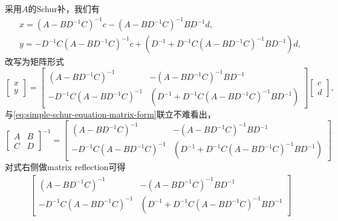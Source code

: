 \begin{subappendices}
采用$A$的Schur补，我们有
\begin{equation*}
  \begin{split}
    &x = \left( A - BD^{-1} C \right)^{-1} c - \left( A - BD^{-1} C \right)^{-1} BD^{-1} d, \\
    &y=-D^{-1} C \left( A - BD^{-1} C \right)^{-1} c + \left( D^{-1} + D^{-1} C \left( A - BD^{-1} C \right)^{-1} B D^{-1} \right) d,
  \end{split}
\end{equation*}
改写为矩阵形式
\begin{equation}
  \label{eq:simple-schur-A-rewrite-M}
  \begin{bmatrix}
    x \\ y
  \end{bmatrix} =
  \begin{bmatrix}
    \left( A - BD^{-1} C \right)^{-1} & - \left( A - BD^{-1} C \right)^{-1} BD^{-1} \\
    -D^{-1} C \left( A - BD^{-1} C \right)^{-1} & \left(
      D^{-1} + D^{-1} C \left( A - BD^{-1} C \right)^{-1} B D^{-1}
    \right)
  \end{bmatrix}
  \begin{bmatrix}
    c \\ d
  \end{bmatrix},
\end{equation}
与\eqref{eq:simple-schur-equation-matrix-form}联立不难看出，
\begin{equation}
  \label{eq:simple-schur-equation-matrix-inverse}
  \begin{bmatrix}
    A & B \\ C & D
  \end{bmatrix}^{-1}
  =
  \begin{bmatrix}
    \left( A - BD^{-1} C \right)^{-1} & - \left( A - BD^{-1} C \right)^{-1} BD^{-1} \\
    -D^{-1} C \left( A - BD^{-1} C \right)^{-1} & \left(
      D^{-1} + D^{-1} C \left( A - BD^{-1} C \right)^{-1} B D^{-1}
    \right)
  \end{bmatrix}
\end{equation}
对式右侧做matrix reflection可得
\begin{equation*}
  \begin{split}
    & \begin{bmatrix}
      \left( A - BD^{-1} C \right)^{-1} & - \left( A - BD^{-1} C \right)^{-1} BD^{-1} \\
      -D^{-1} C \left( A - BD^{-1} C \right)^{-1} & \left(
        D^{-1} + D^{-1} C \left( A - BD^{-1} C \right)^{-1} B D^{-1}

\end{bmatrix}
\end{split}
\end{equation*}
\end{subappendices}

